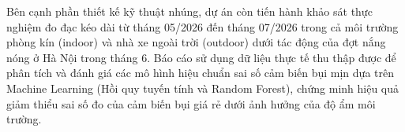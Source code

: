 \documentclass[12pt,a4paper,oneside]{report}
\begin{document}
Bên cạnh phần thiết kế kỹ thuật nhúng, dự án còn tiến hành khảo sát thực nghiệm đo đạc kéo dài từ tháng 05/2026 đến tháng 07/2026 trong cả môi trường phòng kín (indoor) và nhà xe ngoài trời (outdoor) dưới tác động của đợt nắng nóng ở Hà Nội trong tháng 6. Báo cáo sử dụng dữ liệu thực tế thu thập được để phân tích và đánh giá các mô hình hiệu chuẩn sai số cảm biến bụi mịn dựa trên Machine Learning (Hồi quy tuyến tính và Random Forest), chứng minh hiệu quả giảm thiểu sai số đo của cảm biến bụi giá rẻ dưới ảnh hưởng của độ ẩm môi trường.

\tableofcontents
\newpage

\listoffigures
\newpage

\listoftables
\newpage











\appendix



\end{document}

